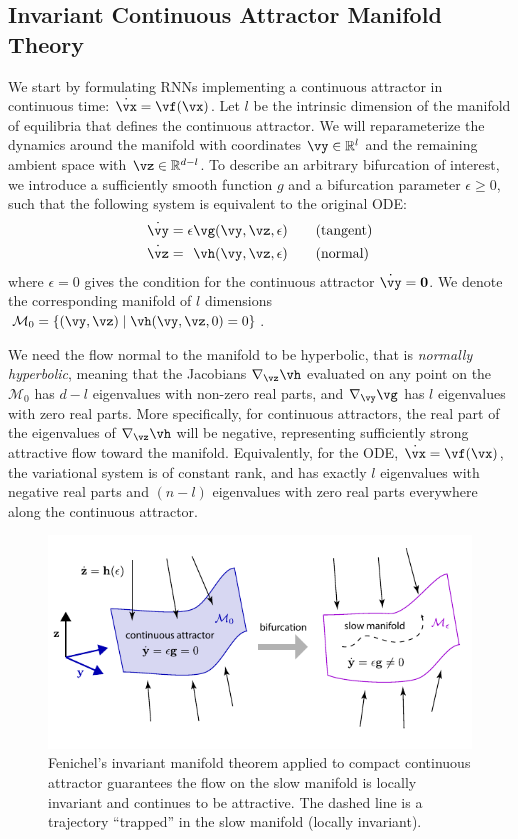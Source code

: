 \documentclass{article}
\newcounter{ct}
\newcommand{\reals}{\mathbb{R}}
\newcommand{\manifold}{\mathcal{M}}
\theoremstyle{definition}
\theoremstyle{remark}
\begin{document}
\subsection{Invariant Continuous Attractor Manifold Theory}\label{sec:imt}
We start by formulating RNNs implementing a continuous attractor in continuous time: $\dot{\vx} = \vf(\vx)$.
Let $l$ be the intrinsic dimension of the manifold of equilibria that defines the continuous attractor.
We will reparameterize the dynamics around the manifold with coordinates $\vy \in \reals^l$ and the remaining ambient space with $\vz \in \reals^{d-l}$.
To describe an arbitrary bifurcation of interest, we introduce a sufficiently smooth function $g$ and a bifurcation parameter $\epsilon \geq 0$, such that the following system is equivalent to the original ODE:
\begin{align}\label{eq:fenichel:flow}
    \dot{\vy} &=           \epsilon  \vg(\vy, \vz, \epsilon) \qquad \text{(tangent)}\\
    \dot{\vz} &= \hphantom{\epsilon} \vh(\vy, \vz, \epsilon) \qquad \text{(normal)}
\end{align}
where $\epsilon = 0$ gives the condition for the continuous attractor $\dot{\vy} = \mathbf{0}$.
We denote the corresponding manifold of $l$ dimensions $\manifold_0 = \{(\vy,\vz) \mid \vh(\vy,\vz,0) = 0\}$.

We need the flow normal to the manifold to be hyperbolic, that is \emph{normally hyperbolic}, meaning that the Jacobians $\nabla_\vz \vh$ evaluated on any point on the $\manifold_0$ has $d-l$ eigenvalues with non-zero real parts, and $\nabla_\vy \vg$ has $l$ eigenvalues with zero real parts.
More specifically, for continuous attractors, the real part of the eigenvalues of $\nabla_\vz \vh$ will be negative, representing sufficiently strong attractive flow toward the manifold.
Equivalently, for the ODE, $\dot{\vx} = \vf(\vx)$, the variational system is of constant rank, and has exactly $l$ eigenvalues with negative real parts and $(n-l)$ eigenvalues with zero real parts everywhere along the continuous attractor.

\begin{figure}[bthp]
  \centering
  \includegraphics{figures/FenichelThm.pdf}
  \caption{
    Fenichel's invariant manifold theorem applied to compact continuous attractor guarantees the flow on the slow manifold is locally invariant and continues to be attractive.
    The dashed line is a trajectory ``trapped'' in the slow manifold (locally invariant).
  }
  \label{fig:fenichel}
\end{figure}
\end{document}
